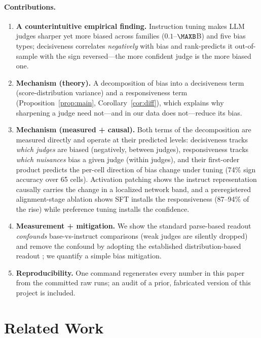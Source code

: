 \documentclass[11pt]{article}
\begin{document}
\paragraph{Contributions.}
\begin{enumerate}\itemsep2pt
  \item \textbf{A counterintuitive empirical finding.} Instruction tuning makes LLM
        judges sharper yet more biased across \NFAM{} families ($0.1$--$\MAXB$B) and five
        bias types; decisiveness correlates \emph{negatively} with bias and rank-predicts
        it out-of-sample with the sign reversed---the more confident judge is the more
        biased one.
  \item \textbf{Mechanism (theory).} A decomposition of bias into a decisiveness term
        (score-distribution variance) and a responsiveness term (Proposition~\ref{prop:main},
        Corollary~\ref{cor:diff}), which explains why sharpening a judge need not---and in
        our data does not---reduce its bias.
  \item \textbf{Mechanism (measured + causal).} Both terms of the decomposition are
        measured directly and operate at their predicted levels: decisiveness tracks
        \emph{which judges} are biased (negatively, between judges), responsiveness tracks
        \emph{which nuisances} bias a given judge (within judges), and their first-order
        product predicts the per-cell direction of bias change under tuning (74\% sign
        accuracy over 65 cells). Activation patching shows the instruct representation
        causally carries the change in a localized network band, and a preregistered
        alignment-stage ablation shows SFT installs the responsiveness (87--94\% of the
        rise) while preference tuning installs the confidence.
  \item \textbf{Measurement + mitigation.} We show the standard parse-based readout
        \emph{confounds} base-vs-instruct comparisons (weak judges are silently dropped)
        and remove the confound by adopting the established distribution-based readout
        \citep{liu2023geval,wang2025judgmentdist}; we quantify a simple bias mitigation.
  \item \textbf{Reproducibility.} One command regenerates every number in this paper
        from the committed raw runs; an audit of a prior, fabricated version of this
        project is included.
\end{enumerate}

\section{Related Work}
\end{document}
